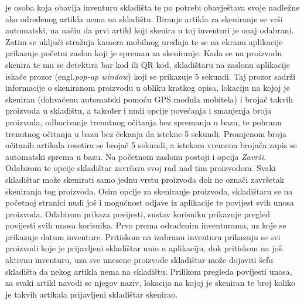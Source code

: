 		 je osoba koja obavlja inventuru skladišta te po potrebi obavještava svoje nadležne ako određenog artikla nema na skladištu. Biranje artikla za skeniranje se vrši automatski, na način da prvi artikl koji skenira u toj inventuri je onaj odabrani. Zatim se uključi stražnja kamera mobilnog uređaja te se na ekranu aplikacije prikazuje početni zaslon koji je spreman za skeniranje. Kada se na proizvodu skenira te mu se detektira bar kod ili QR kod, skladištaru na zaslonu aplikacije iskače prozor (engl.\emph{pop-up window}) koji se prikazuje 5 sekundi. Taj prozor sadrži informacije o skeniranom proizvodu u obliku kratkog opisa, lokaciju na kojoj je skeniran (dohvaćenu automatski pomoću GPS modula mobitela) i brojač takvih proizvoda u skladištu, a također i nudi opcije povećanja i smanjenja broja proizvoda, odbacivanje trenutnog očitanja bez spremanja u bazu, te pohranu trenutnog očitanja u bazu bez čekanja da istekne 5 sekundi. Promjenom broja očitanih artikala resetira se brojač 5 sekundi, a istekom vremena brojača zapis se automatski sprema u bazu. Na početnom zaslonu postoji i opcija \emph{Završi}. Odabirom te opcije skladištar završava svoj rad nad tim proizvodom. Svaki skladištar može skenirati samo jednu vrstu proizvoda dok ne označi završetak skeniranja tog proizvoda. Osim opcije za skeniranje proizvoda, skladištaru se na početnoj stranici nudi još i mogućnost odjave iz aplikacije te povijest svih unosa proizvoda. Odabirom prikaza povijesti, sustav korisniku prikazuje pregled povijesti svih unosa korisnika. Prvo prema odrađenim inventurama, uz koje se prikazuje datum inventure. Pritiskom na izabranu inventuru prikazuju se svi proizvodi koje je prijavljeni skladištar unio u aplikaciju, dok pritiskom na još aktivnu inventuru, uza sve unesene proizvode skladištar može dojaviti šefu skladišta da nekog artikla nema na skladištu. Prilikom pregleda povijesti unosa, za svaki artikl navodi se njegov naziv, lokacija na kojoj je skeniran te broj koliko je takvih artikala prijavljeni skladištar skenirao.
		
